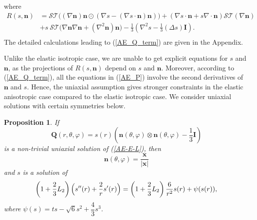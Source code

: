 \documentclass[10pt, a4paper]{article}
\newtheorem{proposition}{Proposition}[section]
\newcommand\n{\mathbf{n}}
\newcommand\x{\mathbf{x}}
\newcommand\Qvec{\mathbf{Q}}
\begin{document}
 where
\begin{equation}
  \begin{aligned}
 R(s, \n) & = \mathcal{ST}  \bigl( (\nabla \n) \n \odot (\nabla s - (\nabla s \cdot \n)  \n ) \bigr)  + (\nabla s \cdot \n + s \nabla \cdot \n) \mathcal{ST}(\nabla \n)  \\
      & + s~ \mathcal{ST} \bigl( \nabla \n \nabla \n + (\nabla^2 \n)\n \bigr) - \frac{1}{3} \left( \nabla^2 s - \frac{1}{3} (\Delta s) \mathbf{I} \right). \\
  \end{aligned}
\end{equation}
The detailed calculations leading to (\ref{AE_Q_term}) are given in the Appendix.



Unlike the elastic isotropic case, we are unable to get explicit equations for $s$ and $\n$, as the projections of $R(s, \n)$ depend on $s$ and $\n$.
Moreover, according to (\ref{AE_Q_term}), all the equations in (\ref{AE_P}) involve the second derivatives of $\n$ and $s$. Hence, the uniaxial assumption gives stronger constraints in the elastic anisotropic case compared to the elastic isotropic case.
We consider uniaxial solutions with certain symmetries below.


\begin{proposition}
\label{prop:4.1} If 
\begin{equation}\label{Ansatz}
\Qvec(r, \theta, \varphi) = s(r) \left( \n(\theta, \varphi) \otimes \n(\theta, \varphi) - \frac{1}{3} \mathbf{I} \right)
\end{equation}
is a non-trivial uniaxial solution of (\ref{AE-E-L}),
then 
\begin{equation}
\n(\theta, \varphi) = \frac{\x}{|\x|}
\end{equation}
and $s$ is a solution of 
\begin{equation}\label{AE_eq_h}
  \left( 1 + \frac{2}{3} L_2 \right) \Bigl( s''(r) + \frac{2}{r} s'(r) \Bigr) = \left( 1 + \frac{2}{3} L_2 \right) \frac{6}{r^2} s(r) + \psi(s(r)),  %
\end{equation}
where $\psi(s) = ts - \sqrt{6} s^2 + \dfrac{4}{3} s^3$.

\end{proposition}
\end{document}
